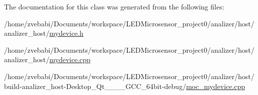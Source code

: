 The documentation for this class was generated from the following files\+:\begin{DoxyCompactItemize}
\item 
/home/zvebabi/\+Documents/workspace/\+L\+E\+D\+Microsensor\+\_\+project0/analizer/host/analizer\+\_\+host/\hyperlink{mydevice_8h}{mydevice.\+h}\item 
/home/zvebabi/\+Documents/workspace/\+L\+E\+D\+Microsensor\+\_\+project0/analizer/host/analizer\+\_\+host/\hyperlink{mydevice_8cpp}{mydevice.\+cpp}\item 
/home/zvebabi/\+Documents/workspace/\+L\+E\+D\+Microsensor\+\_\+project0/analizer/host/build-\/analizer\+\_\+host-\/\+Desktop\+\_\+\+Qt\+\_\+\_\+\_\+\_\+\+G\+C\+C\+\_\+64bit-\/debug/\hyperlink{build-analizer__host-_desktop___qt__5__9__0___g_c_c__64bit-debug_2moc__mydevice_8cpp}{moc\+\_\+mydevice.\+cpp}\end{DoxyCompactItemize}
